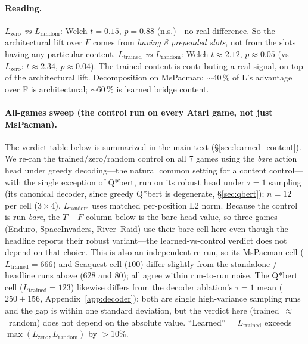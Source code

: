 \documentclass[11pt]{article}
\begin{document}
\paragraph{Reading.}
\emph{$L_{\text{zero}}$ vs $L_{\text{random}}$}: Welch $t\!=\!0.15$, $p\!=\!0.88$ (n.s.)---no real difference. So the architectural lift over $F$ comes from \emph{having 8 prepended slots}, not from the slots having any particular content. \emph{$L_{\text{trained}}$ vs $L_{\text{random}}$}: Welch $t\!\approx\!2.12$, $p\!\approx\!0.05$ (vs $L_{\text{zero}}$: $t\!\approx\!2.34$, $p\!\approx\!0.04$). The trained content is contributing a real signal, on top of the architectural lift. Decomposition on MsPacman: $\sim$40\,\% of L's advantage over F is architectural; $\sim$60\,\% is learned bridge content.

\paragraph{All-games sweep (the control run on every Atari game, not just MsPacman).}
The verdict table below is summarized in the main text (\S\ref{sec:learned_content}).
We re-ran the trained/zero/random control on all 7 games using the \emph{bare} action head
under greedy decoding---the natural common setting for a content control---with the single
exception of Q*bert, run on its robust head under $\tau\!=\!1$ sampling (its canonical decoder,
since greedy Q*bert is degenerate, \S\ref{sec:qbert}); $n\!=\!12$ per cell ($3\times4$).
$L_{\text{random}}$ uses matched per-position L2 norm. Because the control is run \emph{bare}, the
$T\!-\!F$ column below is the bare-head value, so three games (Enduro, SpaceInvaders, River~Raid)
use their bare cell here even though the headline reports their robust variant---the learned-vs-control
verdict does not depend on that choice. This is also an independent re-run, so its MsPacman cell
($L_{\text{trained}}\!=\!666$) and Seaquest cell ($100$) differ slightly from the standalone /
headline runs above ($628$ and $80$); all agree within run-to-run noise. The Q*bert cell
($L_{\text{trained}}\!=\!123$) likewise differs from the decoder ablation's $\tau\!=\!1$ mean
($250\pm156$, Appendix~\ref{app:decoder}); both are single high-variance sampling runs and the
gap is within one standard deviation, but the verdict here (trained~$\approx$~random) does not
depend on the absolute value. ``Learned'' =
$L_{\text{trained}}$ exceeds $\max(L_{\text{zero}},L_{\text{random}})$ by $>\!10\%$.
\end{document}
